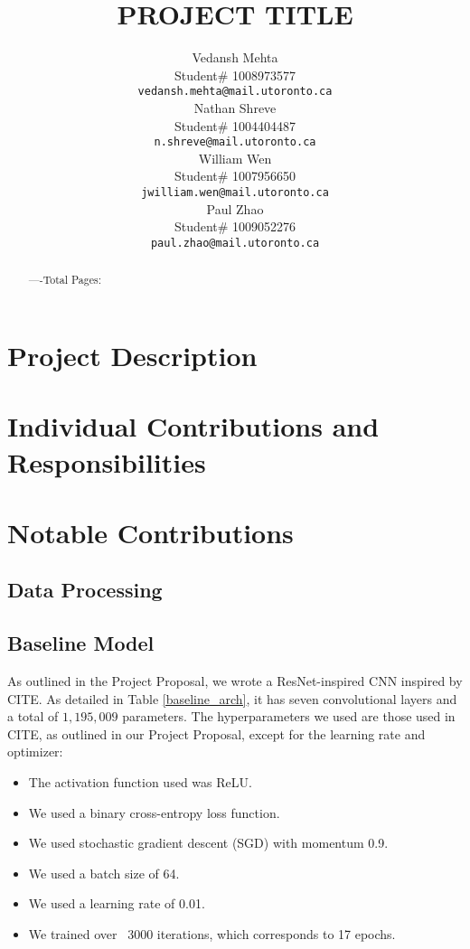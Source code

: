 \documentclass{article} %
\title{PROJECT TITLE}
\author{Vedansh Mehta  \\
Student\# 1008973577 \\
\texttt{vedansh.mehta@mail.utoronto.ca} \\
\And
Nathan Shreve  \\
Student\# 1004404487 \\
\texttt{n.shreve@mail.utoronto.ca} \\
\AND
William Wen  \\
Student\# 1007956650 \\
\texttt{jwilliam.wen@mail.utoronto.ca} \\
\And
Paul Zhao \\
Student\# 1009052276 \\
\texttt{paul.zhao@mail.utoronto.ca} \\
\AND
}
\begin{document}
\maketitle

\begin{abstract}
    ----Total Pages: \pageref{last_page}
\end{abstract}



\section{Project Description}


\section{Individual Contributions and Responsibilities}


\section{Notable Contributions}

\subsection{Data Processing}


\subsection{Baseline Model}

As outlined in the Project Proposal, we wrote a ResNet-inspired CNN inspired by CITE. As detailed in Table \ref{baseline_arch}, it has seven convolutional layers and a total of $1,195,009$ parameters. The hyperparameters we used are those used in CITE, as outlined in our Project Proposal, except for the learning rate and optimizer:
\begin{itemize}
    \item The activation function used was ReLU.
    \item We used a binary cross-entropy loss function.
    \item We used stochastic gradient descent (SGD) with momentum 0.9.
    \item We used a batch size of 64.
    \item We used a learning rate of 0.01.
    \item We trained over ~3000 iterations, which corresponds to 17 epochs.
\end{itemize}
\end{document}
